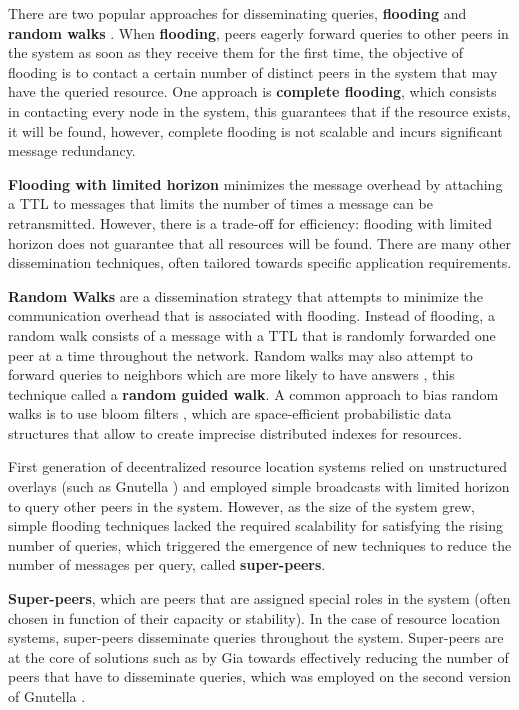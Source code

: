 There are two popular approaches for disseminating queries, \textbf{flooding} and \textbf{random walks} \cite{leitaoPHDthesis}. When \textbf{flooding}, peers eagerly forward queries to other peers in the system as soon as they receive them for the first time, the objective of flooding is to contact a certain number of distinct peers in the system that may have the queried resource. One approach is \textbf{complete flooding}, which consists in contacting every node in the system, this guarantees that if the resource exists, it will be found, however, complete flooding is not scalable and incurs significant message redundancy. 

\textbf{Flooding with limited horizon} minimizes the message overhead by attaching a TTL to messages that limits the number of times a message can be retransmitted. However, there is a trade-off for efficiency: flooding with limited horizon does not guarantee that all resources will be found. There are many other dissemination techniques, often tailored towards specific application requirements. 

\textbf{Random Walks} are a dissemination strategy that attempts to minimize the communication overhead that is associated with flooding. Instead of flooding, a random walk consists of a message with a TTL that is randomly forwarded one peer at a time throughout the network. Random walks may also attempt to forward queries to neighbors which are more likely to have answers \cite{1022239}, this technique called a \textbf{random guided walk}. A common approach to bias random walks is to use bloom filters \cite{5751342}, which are space-efficient probabilistic data structures that allow to  create imprecise distributed indexes for resources.

First generation of decentralized resource location systems relied on unstructured overlays (such as Gnutella \cite{gnutella_gtk}) and employed simple broadcasts with limited horizon to query other peers in the system. However, as the size of the system grew, simple flooding techniques lacked the required scalability for satisfying the rising number of queries, which triggered the emergence of new techniques to reduce the number of messages per query, called \textbf{super-peers}. 

\textbf{Super-peers}, which are peers that are assigned special roles in the system (often chosen in function of their capacity or stability). In the case of resource location systems, super-peers disseminate queries throughout the system. Super-peers are at the core of solutions such as by Gia \cite{Chawathe2003} towards effectively reducing the number of peers that have to disseminate queries, which was employed on the second version of Gnutella \cite{gnutella_gtk}. 

